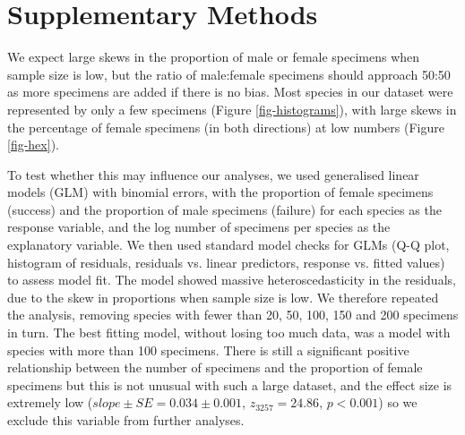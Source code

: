 \documentclass[a4paper, 12pt]{article}
\begin{document}

\newpage
\section{Supplementary Methods}

We expect large skews in the proportion of male or female specimens when sample size is low, but the ratio of male:female specimens should approach 50:50 as more specimens are added if there is no bias. 
Most species in our dataset were represented by only a few specimens (Figure \ref{fig-histograms}), with large skews in the percentage of female specimens (in both directions) at low numbers (Figure \ref{fig-hex}).

To test whether this may influence our analyses, we used generalised linear models (GLM) with binomial errors, with the proportion of female specimens (success) and the proportion of male specimens (failure) for each species as the response variable, and the log number of specimens per species as the explanatory variable. 
We then used standard model checks for GLMs (Q-Q plot, histogram of residuals, residuals vs. linear predictors, response vs. fitted values) to assess model fit. 
The model showed massive heteroscedasticity in the residuals, due to the skew in proportions when sample size is low. 
We therefore repeated the analysis, removing species with fewer than 20, 50, 100, 150 and 200 specimens in turn. 
The best fitting model, without losing too much data, was a model with species with more than 100 specimens. 
There is still a significant positive relationship between the number of specimens and the proportion of female specimens but this is not unusual with such a large dataset, and the effect size is extremely low ($slope \pm SE = 0.034 \pm 0.001$, $z_3257 = 24.86$, $p < 0.001$) so we exclude this variable from further analyses.
\end{document}
